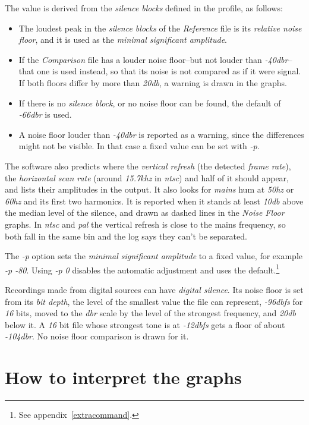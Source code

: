 \documentclass[10pt,a4paper]{report}
\newcommand{\ac}[1]{\textit{\mbox{\acrshort{#1}}}}
\newcommand{\hz}[1]{\textit{\mbox{#1\acrshort{hz}}}}
\newcommand{\khz}[1]{\textit{\mbox{#1\acrshort{khz}}}}
\newcommand{\db}[1]{\textit{\mbox{#1\acrshort{db}}}}
\newcommand{\dbfs}[1]{\textit{\mbox{#1\acrshort{dbfs}}}}
\newcommand{\dbr}[1]{\textit{\mbox{#1\acrshort{dbr}}}}
\begin{document}
The value is derived from the \textit{silence blocks} defined in the profile, as follows:

\begin{itemize}
	\item The loudest peak in the \textit{silence blocks} of the \textit{Reference} file is its \textit{relative noise floor}, and it is used as the \textit{minimal significant amplitude}. 
	\item If the \textit{Comparison} file has a louder noise floor--but not louder than \dbr{-40}--that one is used instead, so that its noise is not compared as if it were signal. If both floors differ by more than \db{20}, a warning is drawn in the graphs.
	\item If there is no \textit{silence block}, or no noise floor can be found, the default of \dbr{-66} is used.
	\item A noise floor louder than \dbr{-40} is reported as a warning, since the differences might not be visible. In that case a fixed value can be set with \textit{-p}.
\end{itemize}

The software also predicts where the \textit{vertical refresh} (the detected \textit{frame rate}), the \textit{horizontal scan rate} (around \khz{15.7} in \ac{ntsc}) and half of it should appear, and lists their amplitudes in the output. It also looks for \textit{mains} hum at \hz{50} or \hz{60} and its first two harmonics. It is reported when it stands at least \db{10} above the median level of the silence, and drawn as dashed lines in the \textit{Noise Floor} graphs. In \ac{ntsc} and \ac{pal} the vertical refresh is close to the mains frequency, so both fall in the same bin and the log says they can't be separated.

The \textit{-p} option sets the \textit{minimal significant amplitude} to a fixed value, for example \textit{-p -80}. Using \textit{-p 0} disables the automatic adjustment and uses the default.\footnote{See appendix~\ref{extracommand}.}

Recordings made from digital sources can have \textit{digital silence}. Its noise floor is set from its \textit{bit depth}, the level of the smallest value the file can represent, \dbfs{-96} for \textit{16} bits, moved to the \ac{dbr} scale by the level of the strongest frequency, and \db{20} below it. A \textit{16} bit file whose strongest tone is at \dbfs{-12} gets a floor of about \dbr{-104}. No noise floor comparison is drawn for it.

\chapter{How to interpret the graphs}
\label{howtographs}
\end{document}
